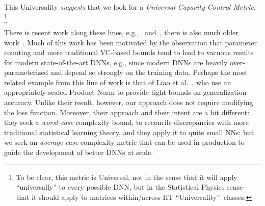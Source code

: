 This Universality \emph{suggests} that we look for a \emph{Universal Capacity Control Metric}.
\footnote{To be clear, this metric is Universal, not in the sense that it will apply ``universally'' to every possible DNN, but in the Statistical Physics sense~\cite{SornetteBook,BouchaudPotters03} that it should apply to matrices within/across HT ``Universality''~classes.}


There is recent work along these lines, e.g.,~\cite{LMBx18_TR, SHNx17_TR,PLMx18_TR} and~\cite{NTS14_TR,NTS15,NBMS17_TR,BFT17_TR,YM17_TR,KKB17_TR,NBS17_TR,AGNZ18_TR,ACH18_TR,ZF18_TR},
 there is also much older work~\cite{Bar97,MN09_TR}.
Much of this work has been motivated by the observation that parameter counting and more traditional VC-based bounds tend to lead to vacuous results for modern state-of-the-art DNNs, e.g., since modern DNNs are heavily over-parameterized and depend so strongly on the training data.
Perhaps the most related example from this line of work is that of Liao et al.~\cite{LMBx18_TR}, who use an appropriately-scaled Product Norm to provide tight bounds on generalization accuracy.
Unlike their result, however, our approach does not require modifying the loss function.
Moreover, their approach and their intent are a bit different: they seek a \emph{worst-case} complexity bound, to reconcile discrepancies with more traditional statistical learning theory, and they apply it to quite small NNs; but we seek an \emph{average-case} complexity metric that can be used in production to guide the development of better DNNs at scale.

